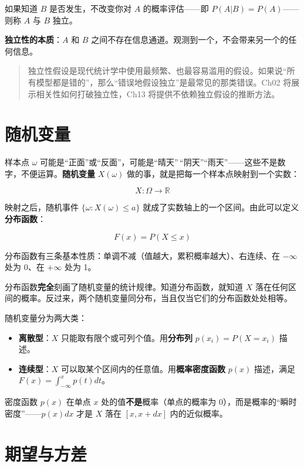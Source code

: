 \documentclass[
]{book}
\providecommand{\tightlist}{%
  \setlength{\itemsep}{0pt}\setlength{\parskip}{0pt}}
\begin{document}
如果知道 \(B\) 是否发生，不改变你对 \(A\) 的概率评估------即 \(P(A|B) = P(A)\)------则称 \(A\) 与 \(B\) 独立。

\textbf{独立性的本质}：\(A\) 和 \(B\) 之间不存在信息通道。观测到一个，不会带来另一个的任何信息。

\begin{quote}
独立性假设是现代统计学中使用最频繁、也最容易滥用的假设。如果说``所有模型都是错的''，那么``错误地假设独立''是最常见的那类错误。Ch02 将展示相关性如何打破独立性，Ch13 将提供不依赖独立假设的推断方法。
\end{quote}

\section{随机变量}\label{ux968fux673aux53d8ux91cf}

样本点 \(\omega\) 可能是``正面''或``反面''，可能是``晴天''\,``阴天''``雨天''------这些不是数字，不便运算。\textbf{随机变量} \(X(\omega)\) 做的事，就是把每一个样本点映射到一个实数：

\[X: \Omega \to \mathbb{R}\]

映射之后，随机事件 \(\{\omega: X(\omega) \leq a\}\) 就成了实数轴上的一个区间。由此可以定义\textbf{分布函数}：

\[F(x) = P(X \leq x)\]

分布函数有三条基本性质：单调不减（值越大，累积概率越大）、右连续、在 \(-\infty\) 处为 0、在 \(+\infty\) 处为 1。

分布函数\textbf{完全}刻画了随机变量的统计规律。知道分布函数，就知道 \(X\) 落在任何区间的概率。反过来，两个随机变量同分布，当且仅当它们的分布函数处处相等。

随机变量分为两大类：

\begin{itemize}
\tightlist
\item
  \textbf{离散型}：\(X\) 只能取有限个或可列个值。用\textbf{分布列} \(p(x_i) = P(X = x_i)\) 描述。
\item
  \textbf{连续型}：\(X\) 可以取某个区间内的任意值。用\textbf{概率密度函数} \(p(x)\) 描述，满足 \(F(x) = \int_{-\infty}^x p(t)dt\)。
\end{itemize}

密度函数 \(p(x)\) 在单点 \(x\) 处的值\textbf{不是}概率（单点的概率为 0），而是概率的``瞬时密度''------\(p(x)dx\) 才是 \(X\) 落在 \([x, x+dx]\) 内的近似概率。

\section{期望与方差}\label{ux671fux671bux4e0eux65b9ux5dee}
\end{document}
